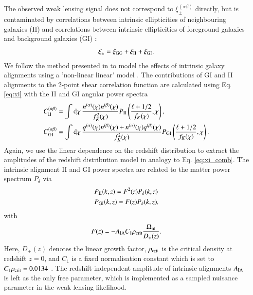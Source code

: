 \documentclass{aa}
\newcommand{\eq}[1]{\begin{equation}  #1 \end{equation}}
\newcommand{\eqa}[1]{\begin{align}   #1 \end{align}}
\newcommand{\dd}{{\rm d}}
\begin{document}
The observed weak lensing signal does not correspond to $\xi_\pm^{(\alpha\beta)}$ directly, but is contaminated by correlations between intrinsic ellipticities of neighbouring galaxies (II) and correlations between intrinsic ellipticities of foreground galaxies and background galaxies (GI) \citep{hirata04}:
\eq{
\xi_\pm = \xi_{\rm GG} + \xi_{\rm II}+ \xi_{\rm GI}.
}
We follow the method presented in \cite{hildebrandt17} to model the effects of intrinsic galaxy alignments using a 'non-linear linear' model \citep{hirata04,bridle07,joachimi11}. The contributions of GI and II alignments to the 2-point shear correlation function are calculated using Eq. \eqref{eq:xi} with the II and GI angular power spectra
\eqa{
C_{\rm II}^{(\alpha\beta)} &=\int\dd\chi\,\frac{n^{(\alpha)}(\chi)n^{(\beta)}(\chi)}{f_K^2(\chi)}P_{\rm II}\left(\frac{\ell + 1/2}{f_K(\chi)},\chi\right),\\ 
C_{\rm GI}^{(\alpha\beta)} &=\int\dd\chi\,\frac{q^{(\alpha)}(\chi)n^{(\beta)}(\chi)+n^{(\alpha)}(\chi)q^{(\beta)}(\chi)}{f_K^2(\chi)}P_{\rm GI}\left(\frac{\ell + 1/2}{f_K(\chi)},\chi\right).
}
Again, we use the linear dependence on the redshift distribution to extract the amplitudes of the redshift distribution model in analogy to Eq. \eqref{eq:xi_comb}. 
The intrinsic alignment II and GI power spectra are related to the matter power spectrum $P_\delta$ via
\eqa{
&P_{\rm II}(k,z) = F^2(z) P_\delta(k,z)\label{eq:P_II}\\
&P_{\rm GI}(k,z) = F(z) P_\delta(k,z),\label{eq:P_GI}
}
with
\eq{
\label{eq:F_z}
F(z) = -A_{\rm IA}C_1\rho_{\rm crit} \frac{\Omega_{\rm m}}{D_+(z)}.
}
Here, $D_+(z)$ denotes the linear growth factor, $\rho_{\rm crit}$ is the critical density at redshift $z=0$, and $C_1$ is a fixed normalisation constant which is set to $C_1\rho_{\rm crit} = 0.0134$ \citep{joachimi11}. The redshift-independent amplitude of intrinsic alignments $A_{\rm IA}$ is left as the only free parameter, which is implemented as a sampled nuisance parameter in the weak lensing likelihood. 
\end{document}
